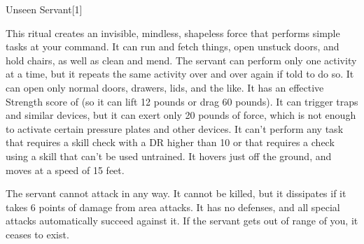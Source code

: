 \begin{spellsection}{Unseen Servant}[1]
    \begin{spellheader}
    \end{spellheader}
    \begin{spellcontent}
        \begin{spelltargetinginfo}
            \spellrng{\rngmed}
        \end{spelltargetinginfo}
        \begin{spelleffects}
            \spelleffect This ritual creates an invisible, mindless, shapeless force that performs simple tasks at your command. It can run and fetch things, open unstuck doors, and hold chairs, as well as clean and mend. The servant can perform only one activity at a time, but it repeats the same activity over and over again if told to do so. It can open only normal doors, drawers, lids, and the like. It has an effective Strength score of  (so it can lift 12 pounds or drag 60 pounds). It can trigger traps and similar devices, but it can exert only 20 pounds of force, which is not enough to activate certain pressure plates and other devices. It can't perform any task that requires a skill check with a DR higher than 10 or that requires a check using a skill that can't be used untrained. It hovers just off the ground, and moves at a speed of 15 feet.
            \par The servant cannot attack in any way. It cannot be killed, but it dissipates if it takes 6 points of damage from area attacks. It has no defenses, and all special attacks automatically succeed against it. If the servant gets out of range of you, it ceases to exist.
            \spelldur \durlong \dismissable
        \end{spelleffects}
    \end{spellcontent}
    \begin{spellfooter}
    \end{spellfooter}
\end{spellsection}

